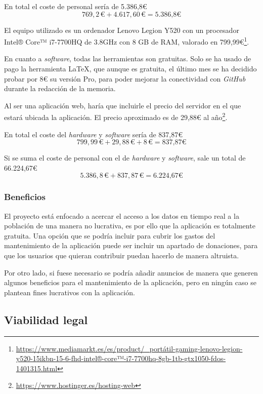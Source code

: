 En total el coste de personal sería de 5.386,8€
$$769,2 \, \text{€} + 4.617,60 \, \text{€} = \text{5.386,8€}$$

El equipo utilizado es un ordenador Lenovo Legion Y520 con un procesador Intel® Core™ i7-7700HQ de 3.8GHz con 8 GB de RAM, valorado en 799,99€\footnote{\url{https://www.mediamarkt.es/es/product/_portátil-gaming-lenovo-legion-y520-15ikbn-15-6-fhd-intel®-core™-i7-7700hq-8gb-1tb-gtx1050-fdos-1401315.html}}.

En cuanto a \textit{software}, todas las herramientas son gratuitas. Solo se ha usado de pago la herramienta \LaTeX{}, que aunque es gratuita, el último mes se ha decidido probar por 8€ su versión Pro, para poder mejorar la conectividad con \textit{GitHub} durante la redacción de la memoria.

Al ser una aplicación web, haría que incluirle el precio del servidor en el que estará ubicada la aplicación. El precio aproximado es de 29,88€ al año\footnote{\url{https://www.hostinger.es/hosting-web}}.

En total el coste del \textit{hardware} y \textit{software} sería de 837,87€
$$799,99 \, \text{€} + 29,88 \, \text{€} + 8 \, \text{€} = \text{837,87€}$$

Si se suma el coste de personal con el de \textit{hardware} y \textit{software}, sale un total de 66.224,67€
$$5.386,8 \, \text{€} + 837,87 \, \text{€} = \text{6.224,67€}$$

\subsubsection{Beneficios}

El proyecto está enfocado a acercar el acceso a los datos en tiempo real a la población de una manera no lucrativa, es por ello que la aplicación es totalmente gratuita.
Una opción que se podría incluir para cubrir los gastos del mantenimiento de la aplicación puede ser incluir un apartado de donaciones, para que los usuarios que quieran contribuir puedan hacerlo de manera altruista.

Por otro lado, si fuese necesario se podría añadir anuncios de manera que generen algunos beneficios para el mantenimiento de la aplicación, pero en ningún caso se plantean fines lucrativos con la aplicación.

\subsection{Viabilidad legal}

